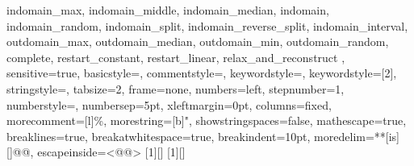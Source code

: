 {{  indomain_max, indomain_middle, indomain_median, indomain,
  indomain_random, indomain_split, indomain_reverse_split, indomain_interval,
  outdomain_max, outdomain_median, outdomain_min, outdomain_random,
  complete, restart_constant, restart_linear, relax_and_reconstruct
  },
  sensitive=true,
  basicstyle=\mznfont,
  commentstyle=\color[rgb]{0.9,0.1,0.1},
  keywordstyle=\color[rgb]{0,0.5,0},
  keywordstyle=[2]\color{blue},
  stringstyle=\color{orange},
  tabsize=2,
  frame=none,
  numbers=left,
  stepnumber=1,
  numberstyle=\tiny,
  numbersep=5pt,
  xleftmargin=0pt, %
  columns=fixed, %
  morecomment=[l]{\%},
  morestring=[b]",
  showstringspaces=false,
  mathescape=true,
  breaklines=true,
  breakatwhitespace=true,
  breakindent=10pt, %
  moredelim=**[is][\color{Melon}]{@}{@},
  escapeinside={{<@}{@>}}
}
[1][]{\lstset{language=Mzn,#1}}{}
[1][]{\lstset{language=Mzn,numbers=none,xleftmargin=0pt,#1}}{}
\newcommand{\mzninline}[1]{\lstinline[{language=Mzn}]|#1|}
\newcommand{\mzninlinebar}[1]{\lstinline[{language=Mzn}]!#1!}
